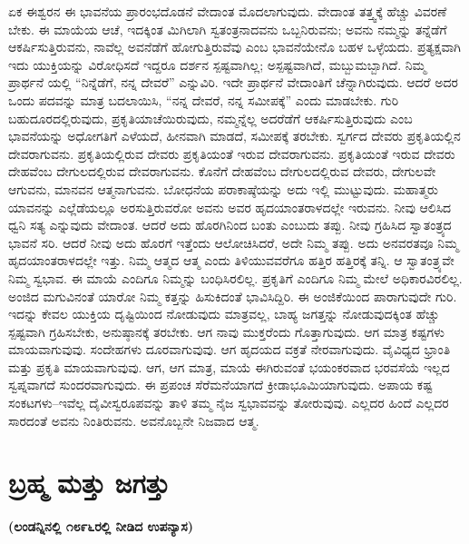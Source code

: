 \vskip 0.2cm

ಏಕ ಈಶ್ವರನ ಈ ಭಾವನೆಯ ಪ್ರಾರಂಭದೊಡನೆ ವೇದಾಂತ ಮೊದಲಾಗುವುದು. ವೇದಾಂತ ತತ್ತ್ವಕ್ಕೆ ಹೆಚ್ಚು ವಿವರಣೆ ಬೇಕು. ಈ ಮಾಯೆಯ ಆಚೆ, ಇದಕ್ಕಿಂತ ಮಿಗಿಲಾಗಿ ಸ್ವತಂತ್ರನಾದವನು ಒಬ್ಬನಿರುವನು; ಅವನು ನಮ್ಮನ್ನು ತನ್ನೆಡೆಗೆ ಆಕರ್ಷಿಸುತ್ತಿರುವನು, ನಾವೆಲ್ಲ ಅವನೆಡೆಗೆ ಹೋಗುತ್ತಿರುವೆವು ಎಂಬ ಭಾವನೆಯೇನೊ ಬಹಳ ಒಳ್ಳೆಯದು. ಪ್ರತ್ಯಕ್ಷವಾಗಿ ಇದು ಯುಕ್ತಿಯನ್ನು ವಿರೋಧಿಸದೆ ಇದ್ದರೂ ದರ್ಶನ ಸ್ಪಷ್ಟವಾಗಿಲ್ಲ; ಅಸ್ಪಷ್ಟವಾಗಿದೆ, ಮಬ್ಬುಮಬ್ಬಾಗಿದೆ. ನಿಮ್ಮ ಪ್ರಾರ್ಥನೆ ಯಲ್ಲಿ “ನಿನ್ನೆಡೆಗೆ, ನನ್ನ ದೇವರೆ” ಎನ್ನುವಿರಿ. ಇದೇ ಪ್ರಾರ್ಥನೆ ವೇದಾಂತಿಗೆ ಚೆನ್ನಾಗಿರುವುದು. ಆದರೆ ಅದರ ಒಂದು ಪದವನ್ನು ಮಾತ್ರ ಬದಲಾಯಿಸಿ, “ನನ್ನ ದೇವರೆ, ನನ್ನ ಸಮೀಪಕ್ಕೆ” ಎಂದು ಮಾಡಬೇಕು. ಗುರಿ ಬಹುದೂರದಲ್ಲಿರುವುದು, ಪ್ರಕೃತಿಯಾಚೆಯಿರುವುದು, ನಮ್ಮನ್ನೆಲ್ಲ ಅದರೆಡೆಗೆ ಆಕರ್ಷಿಸುತ್ತಿರುವುದು ಎಂಬ ಭಾವನೆಯನ್ನು ಅಧೋಗತಿಗೆ ಎಳೆಯದೆ, ಹೀನವಾಗಿ ಮಾಡದೆ, ಸಮೀಪಕ್ಕೆ ತರಬೇಕು. ಸ್ವರ್ಗದ ದೇವರು ಪ್ರಕೃತಿಯಲ್ಲಿನ ದೇವರಾಗುವನು. ಪ್ರಕೃತಿಯಲ್ಲಿರುವ ದೇವರು ಪ್ರಕೃತಿಯಂತೆ ಇರುವ ದೇವರಾಗುವನು. ಪ್ರಕೃತಿಯಂತೆ ಇರುವ ದೇವರು ದೇಹವೆಂಬ ದೇಗುಲದಲ್ಲಿರುವ ದೇವರಾಗುವನು. ಕೊನೆಗೆ ದೇಹವೆಂಬ ದೇಗುಲದಲ್ಲಿರುವ ದೇವರು, ದೇಗುಲವೇ ಆಗುವನು, ಮಾನವನ ಆತ್ಮನಾಗುವನು. ಬೋಧನೆಯ ಪರಾಕಾಷ್ಠೆಯನ್ನು ಅದು ಇಲ್ಲಿ ಮುಟ್ಟುವುದು. ಮಹಾತ್ಮರು ಯಾವನನ್ನು ಎಲ್ಲೆಡೆಯಲ್ಲೂ ಅರಸುತ್ತಿರುವರೋ ಅವನು ಅವರ ಹೃದಯಾಂತರಾಳದಲ್ಲೇ ಇರುವನು. ನೀವು ಆಲಿಸಿದ ಧ್ವನಿ ಸತ್ಯ ಎನ್ನುವುದು ವೇದಾಂತ. ಆದರೆ ಅದು ಹೊರಗಿನಿಂದ ಬಂತು ಎಂಬುದು ತಪ್ಪು. ನೀವು ಗ್ರಹಿಸಿದ ಸ್ವಾತಂತ್ರ್ಯದ ಭಾವನೆ ಸರಿ. ಆದರೆ ನೀವು ಅದು ಹೊರಗೆ ಇತ್ತೆಂದು ಆಲೋಚಿಸಿದರೆ, ಅದೇ ನಿಮ್ಮ ತಪ್ಪು. ಅದು ಅನವರತವೂ ನಿಮ್ಮ ಹೃದಯಾಂತರಾಳದಲ್ಲೇ ಇತ್ತು. ನಿಮ್ಮ ಆತ್ಮದ ಆತ್ಮ ಎಂದು ತಿಳಿಯುವವರೆಗೂ ಹತ್ತಿರ ಹತ್ತಿರಕ್ಕೆ ತನ್ನಿ. ಆ ಸ್ವಾತಂತ್ರ್ಯವೇ ನಿಮ್ಮ ಸ್ವಭಾವ. ಈ ಮಾಯೆ ಎಂದಿಗೂ ನಿಮ್ಮನ್ನು ಬಂಧಿಸಿರಲಿಲ್ಲ. ಪ್ರಕೃತಿಗೆ ಎಂದಿಗೂ ನಿಮ್ಮ ಮೇಲೆ ಅಧಿಕಾರವಿರಲಿಲ್ಲ. ಅಂಜಿದ ಮಗುವಿನಂತೆ ಯಾರೋ ನಿಮ್ಮ ಕತ್ತನ್ನು ಹಿಸುಕಿದಂತೆ ಭಾವಿಸಿದ್ದಿರಿ. ಈ ಅಂಜಿಕೆಯಿಂದ ಪಾರಾಗುವುದೇ ಗುರಿ. ಇದನ್ನು ಕೇವಲ ಯುಕ್ತಿಯ ದೃಷ್ಟಿಯಿಂದ ನೋಡುವುದು ಮಾತ್ರವಲ್ಲ, ಬಾಹ್ಯ ಜಗತ್ತನ್ನು ನೋಡುವುದಕ್ಕಿಂತ ಹೆಚ್ಚು ಸ್ಪಷ್ಟವಾಗಿ ಗ್ರಹಿಸಬೇಕು, ಅನುಷ್ಠಾನಕ್ಕೆ ತರಬೇಕು. ಆಗ ನಾವು ಮುಕ್ತರೆಂದು ಗೊತ್ತಾಗುವುದು. ಆಗ ಮಾತ್ರ ಕಷ್ಟಗಳು ಮಾಯವಾಗುವುವು. ಸಂದೇಹಗಳು ದೂರವಾಗುವುವು. ಆಗ ಹೃದಯದ ವಕ್ರತೆ ನೇರವಾಗುವುದು. ವೈವಿಧ್ಯದ ಭ್ರಾಂತಿ ಮತ್ತು ಪ್ರಕೃತಿ ಮಾಯವಾಗುವುವು. ಆಗ, ಆಗ ಮಾತ್ರ, ಮಾಯೆ ಈಗಿರುವಂತೆ ಭಯಂಕರವಾದ ಭರವಸೆಯೆ ಇಲ್ಲದ ಸ್ವಪ್ನವಾಗದೆ ಸುಂದರವಾಗುವುದು. ಈ ಪ್ರಪಂಚ ಸೆರೆಮನೆಯಾಗದೆ ಕ್ರೀಡಾಭೂಮಿಯಾಗುವುದು. ಅಪಾಯ ಕಷ್ಟ ಸಂಕಟಗಳು–ಇವೆಲ್ಲ ದೈವೀಸ್ವರೂಪವನ್ನು ತಾಳಿ ತಮ್ಮ ನೈಜ ಸ್ವಭಾವವನ್ನು ತೋರುವುವು. ಎಲ್ಲದರ ಹಿಂದೆ ಎಲ್ಲದರ ಸಾರದಂತೆ ಅವನು ನಿಂತಿರುವನು. ಅವನೊಬ್ಬನೇ ನಿಜವಾದ ಆತ್ಮ.

\chapter{ಬ್ರಹ್ಮ ಮತ್ತು ಜಗತ್ತು}%

\centerline{\textbf{(ಲಂಡನ್ನಿನಲ್ಲಿ ೧೮೯೬ರಲ್ಲಿ ನೀಡಿದ ಉಪನ್ಯಾಸ)}}

\vskip 0.2cm

